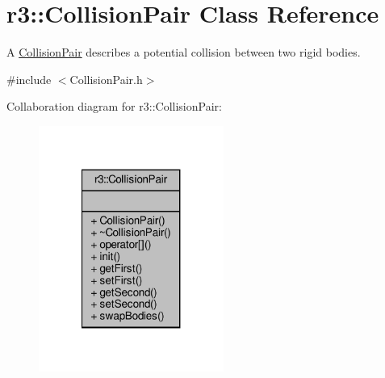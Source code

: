 \hypertarget{classr3_1_1_collision_pair}{}\section{r3\+:\+:Collision\+Pair Class Reference}
\label{classr3_1_1_collision_pair}


A \mbox{\hyperlink{classr3_1_1_collision_pair}{Collision\+Pair}} describes a potential collision between two rigid bodies.  




{\ttfamily \#include $<$Collision\+Pair.\+h$>$}



Collaboration diagram for r3\+:\+:Collision\+Pair\+:\nopagebreak
\begin{figure}[H]
\begin{center}
\leavevmode
\includegraphics[width=172pt]{classr3_1_1_collision_pair__coll__graph}
\end{center}
\end{figure}
